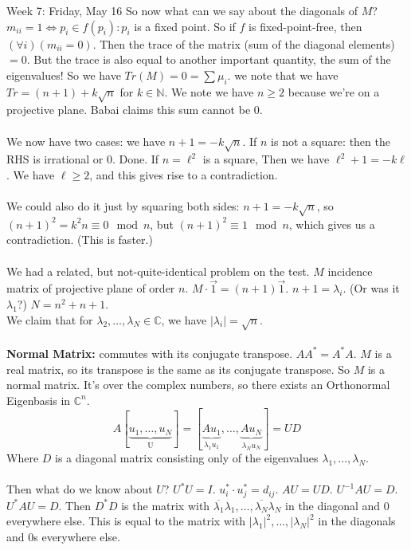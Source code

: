 \documentclass[12pt]{article}
\theoremstyle{remark}
\newcommand{\N}{\mathbb{N}}
\newcommand{\C}{\mathbb{C}}
\newcommand*\w[1]{\overrightarrow{#1}}
\newcommand*\tund[2]{\underbrace{#1}_\text{#2}}
\begin{document}
\begin{section}{Week 7: Friday, May 16}
So now what can we say about the diagonals of $M$? $m_{ii} = 1 \Leftrightarrow p_i \in f(p_i): p_i$ is a fixed point. So if $f$ is fixed-point-free, then $(\forall i)(m_{ii} = 0)$. Then the trace of the matrix (sum of the diagonal elements) $= 0$. But the trace is also equal to another important quantity, the sum of the eigenvalues! So we have $Tr(M) = 0 = \sum \mu_i$. we note that we have $Tr = (n+1) + k\sqrt{n}$ for $k \in \N$. We note we have $n \geq 2$ because we're on a projective plane. Babai claims this sum cannot be $0$.
\\\\
We now have two cases: we have $n+1 = -k\sqrt{n}$. If $n$ is not a square: then the RHS is irrational or $0$. Done. If $n= \ell^2$ is a square, Then we have $\ell^2 + 1 = -k \ell$. We have $\ell \geq 2$, and this gives rise to a contradiction.
\\\\
We could also do it just by squaring both sides: $n+1 = -k\sqrt{n}$, so $(n+1)^2 = k^2n \equiv 0 \mod n$, but $(n+1)^2 \equiv 1 \mod n$, which gives us a contradiction. (This is faster.)
\\\\
We had a related, but not-quite-identical problem on the test. $M$ incidence matrix of projective plane of order $n$. $M \cdot \w{1} = (n+1)\w{1}$. $n+1 = \lambda_i$. (Or was it $\lambda_1$?) $N= n^2 + n + 1$.
\\We claim that for $\lambda_2,\ldots,\lambda_N \in \C$, we have $|\lambda_i| = \sqrt{n}$.
\\\\
\textbf{Normal Matrix:} commutes with its conjugate transpose. $AA^* = A^*A$. $M$ is a real matrix, so its transpose is the same as its conjugate transpose. So $M$ is a normal matrix. It's over the complex numbers, so there exists an Orthonormal Eigenbasis in $\C^n$. 
$$A[\tund{u_1,\ldots,u_N}{U}] = [\underbrace{Au_{1}}_{\lambda_1u_1},\ldots,\underbrace{Au_N}_{\lambda_Nu_N}] = UD$$
Where $D$ is a diagonal matrix consisting only of the eigenvalues $\lambda_1,\ldots,\lambda_N$.
\\\\
Then what do we know about $U$? $U^*U = I$. $u_i^* \cdot u_j^* = d_{ij}$. $AU = UD$. $U^{-1}AU = D$. $U^*AU = D$. Then $D^*D$ is the matrix with $\overline{\lambda_1}\lambda_1,\ldots,\overline{\lambda_N}\lambda_N$ in the diagonal and $0$ everywhere else. This is equal to the matrix with $|\lambda_1|^2, \ldots, |\lambda_N|^2$ in the diagonals and $0$s everywhere else.
\\\\

\end{section}
\end{document}
